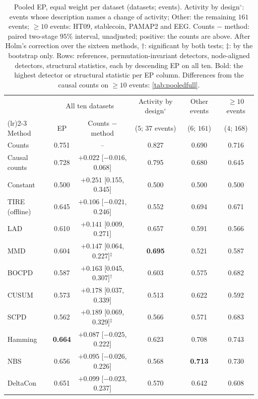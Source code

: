 \documentclass[11pt]{article}
\let\dsmidrule\midrule
\renewcommand{\midrule}{\arrayrulecolor{dsrule}\dsmidrule\arrayrulecolor{dsnavy}}
\let\dscmidrule\cmidrule
\renewcommand{\cmidrule}{\arrayrulecolor{dsrule}\dscmidrule}
\theoremstyle{dsplain}
\theoremstyle{definition}
\begin{document}
\begin{table}[t]
  \centering
  \caption{Pooled EP, equal weight per dataset (datasets; events). Activity by design$^\circ$: events whose
  description names a change of activity; Other: the remaining $161$ events; $\ge 10$ events: HT09,
  stablecoin, PAMAP2 and EEG. Counts $-$ method: paired two-stage $95\%$ interval, unadjusted; positive: the
  counts are above. After Holm's correction over the sixteen methods, $\dagger$: significant by both tests;
  $\ddagger$: by the bootstrap only. Rows: references, permutation-invariant detectors, node-aligned
  detectors, structural statistics, each by descending EP on all ten. Bold: the highest detector or structural
  statistic per EP column. Differences from the causal counts on $\ge 10$ events: \cref{tab:pooledfull}.}
  \label{tab:pooled}
  \scriptsize
  \setlength{\tabcolsep}{3.2pt}
  \begin{tabular}{lccccc}
    \toprule
    & \multicolumn{2}{c}{All ten datasets} & Activity by design$^\circ$ & Other events & $\ge 10$ events \\
    \cmidrule(lr){2-3}
    Method & EP & Counts $-$ method & ($5$; $37$ events) & ($6$; $161$) & ($4$; $168$) \\
    \midrule
    Counts & 0.751 & -- & 0.827 & 0.690 & 0.716 \\
    Causal counts & 0.728 & $+0.022$ [$-0.016$, 0.068] & 0.795 & 0.680 & 0.645 \\
    Constant & 0.500 & $+0.251$ [0.155, 0.345] & 0.500 & 0.500 & 0.500 \\
    \midrule
    TIRE (offline) & 0.645 & $+0.106$ [$-0.021$, 0.246] & 0.552 & 0.694 & 0.671 \\
    LAD & 0.610 & $+0.141$ [0.009, 0.271] & 0.657 & 0.591 & 0.566 \\
    MMD & 0.604 & $+0.147$ [0.064, 0.227]$^\ddagger$ & \textbf{0.695} & 0.521 & 0.587 \\
    BOCPD & 0.587 & $+0.163$ [0.045, 0.307]$^\dagger$ & 0.603 & 0.575 & 0.682 \\
    CUSUM & 0.573 & $+0.178$ [0.037, 0.339] & 0.513 & 0.622 & 0.592 \\
    SCPD & 0.562 & $+0.189$ [0.069, 0.329]$^\ddagger$ & 0.566 & 0.571 & 0.683 \\
    \midrule
    Hamming & \textbf{0.664} & $+0.087$ [$-0.025$, 0.222] & 0.623 & 0.708 & 0.743 \\
    NBS & 0.656 & $+0.095$ [$-0.026$, 0.226] & 0.568 & \textbf{0.713} & 0.730 \\
    DeltaCon & 0.651 & $+0.099$ [$-0.023$, 0.237] & 0.570 & 0.642 & 0.608 \\

\end{tabular}
\end{table}
\end{document}
